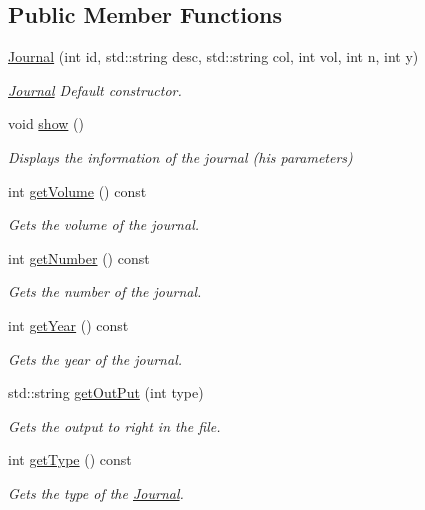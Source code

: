 \subsection*{Public Member Functions}
\begin{DoxyCompactItemize}
\item 
\hyperlink{class_journal_aece55c5ddbc4e548d7183731a527dca3}{Journal} (int id, std\+::string desc, std\+::string col, int vol, int n, int y)
\begin{DoxyCompactList}\small\item\em \hyperlink{class_journal}{Journal} Default constructor. \end{DoxyCompactList}\item 
void \hyperlink{class_journal_a7131809f3865fbdcbba5f38996d29c7a}{show} ()
\begin{DoxyCompactList}\small\item\em Displays the information of the journal (his parameters) \end{DoxyCompactList}\item 
int \hyperlink{class_journal_af853578ebebf1297419889c2f1b5cfc9}{get\+Volume} () const
\begin{DoxyCompactList}\small\item\em Gets the volume of the journal. \end{DoxyCompactList}\item 
int \hyperlink{class_journal_ae2ee9253549e4748814119dd8ad01d2c}{get\+Number} () const
\begin{DoxyCompactList}\small\item\em Gets the number of the journal. \end{DoxyCompactList}\item 
int \hyperlink{class_journal_a9db201ef096712da288a3f3df0d86125}{get\+Year} () const
\begin{DoxyCompactList}\small\item\em Gets the year of the journal. \end{DoxyCompactList}\item 
std\+::string \hyperlink{class_journal_a631e4fa39c9875db342ed8eb1a9f5eb6}{get\+Out\+Put} (int type)
\begin{DoxyCompactList}\small\item\em Gets the output to right in the file. \end{DoxyCompactList}\item 
int \hyperlink{class_journal_ad787716ffbd1d22623245cf98c13ac4a}{get\+Type} () const
\begin{DoxyCompactList}\small\item\em Gets the type of the \hyperlink{class_journal}{Journal}. \end{DoxyCompactList}\end{DoxyCompactItemize}
